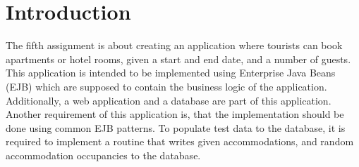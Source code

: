 \section{Introduction}\label{sec:01_intro}
The fifth assignment is about creating an application where tourists can book apartments or hotel rooms, given a start and end date, and a number of guests.
This application is intended to be implemented using Enterprise Java Beans (EJB) which are supposed to contain the business logic of the application. Additionally, a web application and a database are part of this application.
Another requirement of this application is, that the implementation should be done using common EJB patterns.
To populate test data to the database, it is required to implement a routine that writes given accommodations, and random accommodation occupancies to the database.
